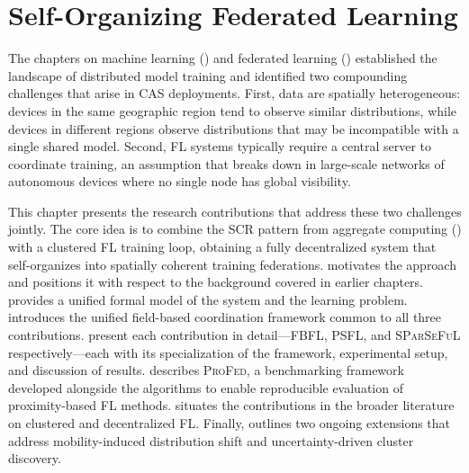 
\chapter{Self-Organizing Federated Learning}
\label{chap:selforg-fl}
\minitoc

The chapters on machine learning ()
 and federated learning ()
 established the landscape of distributed model training and identified two
 compounding challenges that arise in \gls{CAS} deployments.
%
First, data are spatially heterogeneous: devices in the same geographic region
 tend to observe similar distributions,
 while devices in different regions observe distributions that may be
 incompatible with a single shared model.
%
Second, \gls{FL} systems typically require a central server to coordinate training,
 an assumption that breaks down in large-scale networks of autonomous
 devices where no single node has global visibility.

This chapter presents the research contributions that address these two challenges jointly.
%
The core idea is to combine the \gls{SCR} pattern from aggregate computing
 () with a clustered \gls{FL} training loop,
 obtaining a fully decentralized system that self-organizes into
 spatially coherent training federations.
%
 motivates the approach and positions it
 with respect to the background covered in earlier chapters.
%
 provides a unified formal model of
 the system and the learning problem.
%
 introduces the unified field-based coordination framework common to all three contributions.
%
 present each contribution in detail---\gls{FBFL}, \gls{PSFL}, and \textsc{SParSeFuL} respectively---each with its specialization of the framework, experimental setup, and discussion of results.
%
 describes \textsc{ProFed}, a benchmarking framework developed alongside the algorithms to enable reproducible evaluation of proximity-based \gls{FL} methods.
%
 situates the contributions in the
 broader literature on clustered and decentralized \gls{FL}.
%
Finally,  outlines two ongoing extensions
 that address mobility-induced distribution shift and uncertainty-driven
 cluster discovery.


